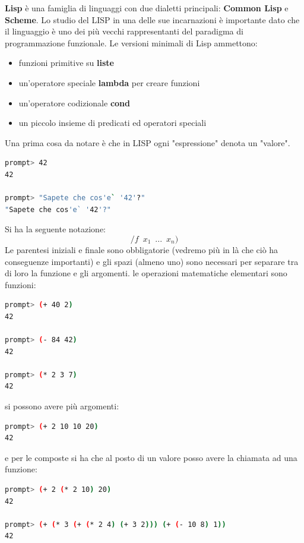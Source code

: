\documentclass[a4paper,12pt, oneside]{book}
\begin{document}
\textbf{Lisp} è una famiglia di linguaggi con due dialetti principali: \textbf{Common Lisp} e \textbf{Scheme}. Lo studio del LISP in una delle sue incarnazioni è importante dato che il linguaggio è uno dei più vecchi rappresentanti del paradigma di programmazione funzionale. Le versioni minimali di Lisp ammettono:
\begin{itemize}
	\item funzioni primitive su \textbf{liste}
	\item un'operatore speciale \textbf{lambda} per creare funzioni
	\item un'operatore codizionale \textbf{cond}
	\item un piccolo insieme di predicati ed operatori speciali
\end{itemize}
Una prima cosa da notare è che in LISP ogni "espressione" denota un
"valore".
\begin{shaded}
	\begin{lstlisting}[language=bash]
prompt> 42
42

prompt> "Sapete che cos'e` '42'?"
"Sapete che cos'e` '42'?"
\end{lstlisting}
\end{shaded} Si ha la seguente notazione:
$$/f\,\,\, x_1\,\,\,...\,\,\, x_n)$$
Le parentesi iniziali e finale sono obbligatorie (vedremo più in là
che ciò ha conseguenze importanti) e gli spazi (almeno uno)
sono necessari per separare tra di loro la funzione e gli argomenti.
le operazioni matematiche elementari sono funzioni:
\begin{shaded}
	\begin{lstlisting}[language=bash]
prompt> (+ 40 2)
42

prompt> (- 84 42)
42

prompt> (* 2 3 7)
42
\end{lstlisting}
\end{shaded}
si possono avere più argomenti:
\begin{shaded}
	\begin{lstlisting}[language=bash]
prompt> (+ 2 10 10 20)
42
\end{lstlisting}
\end{shaded}
e per le composte si ha che al posto di un valore posso avere la chiamata ad una funzione:
\begin{shaded}
	\begin{lstlisting}[language=bash]
prompt> (+ 2 (* 2 10) 20)
42

prompt> (+ (* 3 (+ (* 2 4) (+ 3 2))) (+ (- 10 8) 1))
42
\end{lstlisting}
\end{shaded}
\end{document}
